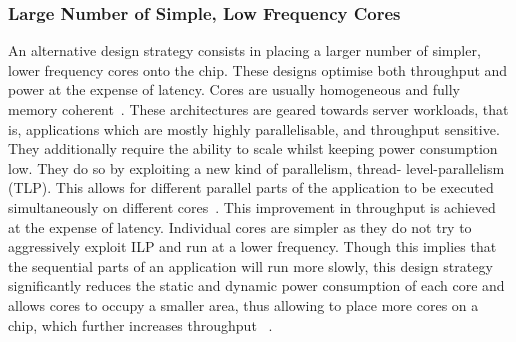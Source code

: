 \subsubsection{Large Number of Simple, Low Frequency Cores} An alternative
design strategy consists in placing a larger number of simpler, lower frequency cores
onto the chip. These designs optimise both throughput and power at the expense of latency.
Cores are  usually homogeneous and fully memory coherent~\cite{Vajda:1414193}. These architectures are
geared towards server workloads, that is, applications which  are mostly highly 
parallelisable, and throughput sensitive. They additionally require the ability
to scale whilst keeping power consumption low.  They do so by exploiting a new kind of parallelism, thread-
level-parallelism (TLP). This allows for different parallel parts of the application
to be executed simultaneously on different cores~\cite{Borkar:2007:TCC:1278480.1278667}. This improvement in 
throughput is achieved at the
expense of latency. Individual cores are simpler as they do not try to aggressively
exploit ILP and run at a lower frequency. Though this implies that the
sequential parts of an application will run more slowly, this design
strategy significantly  reduces the static and dynamic
power consumption of each core and allows cores to occupy a smaller
area, thus allowing to place more cores on a chip, which further increases throughput
~\cite{Borkar:2007:TCC:1278480.1278667,4563876}. 


